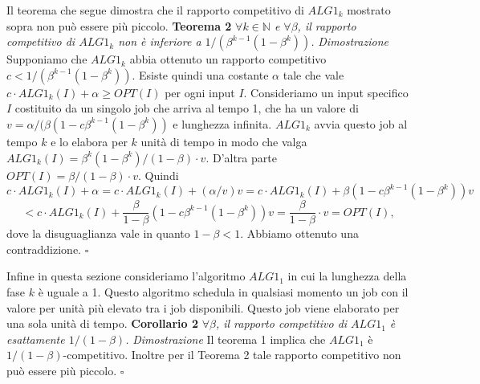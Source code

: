 \documentclass[12pt]{article}
\newcommand*{\N}{\mathbb{N}}
\begin{document}
Il teorema che segue dimostra che il rapporto competitivo di $ALG1_{k}$ mostrato sopra non può essere più piccolo.\newline\newline
\textbf{Teorema 2}
\textit{$\forall k \in \N$ e $\forall \beta$, il rapporto competitivo di $ALG1_{k}$ non è inferiore a $1 / (\beta^{k - 1} (1 - \beta^{k}))$.}\newline\newline
\textit{Dimostrazione}
Supponiamo che $ALG1_{k}$ abbia ottenuto un rapporto competitivo $c < 1 / (\beta^{k - 1} (1 - \beta^{k}))$. Esiste quindi una costante $\alpha$ tale che vale $c \cdot ALG1_{k}(I) + \alpha \geq OPT (I)$ per ogni input $I$. Consideriamo un input specifico $I$ costituito da un singolo job che arriva al tempo 1,  che ha un valore di $v = \alpha / (\beta  (1 - c \beta^{k - 1} (1 - \beta^{k}))$ e lunghezza infinita. $ALG1_{k}$ avvia questo job al tempo $k$ e lo elabora per $k$ unità di tempo in modo che valga $ALG1_{k}(I) = \beta^{k} (1 - \beta^{k}) / (1 - \beta ) \cdot v$. D'altra parte $OPT (I) = \beta  / (1 - \beta ) \cdot v$. Quindi $$c \cdot ALG1_{k}(I) + \alpha = c \cdot ALG1_{k}(I) + (\alpha / v) v = c \cdot ALG1_{k}(I) + \beta  (1 - c\beta^{k - 1} (1 - \beta^{k})) v $$ $$< c \cdot ALG1_{k}(I) + \frac{\beta}{ 1 - \beta} (1 - c\beta^{k - 1} (1 - \beta^{k})) v = \frac{\beta}{1 - \beta} \cdot v = OPT(I),$$dove la disuguaglianza vale in quanto $1 - \beta  <1$. Abbiamo ottenuto una contraddizione. \hfill $\square$ \vspace{5mm}

Infine in questa sezione consideriamo l'algoritmo $ALG1_{1}$ in cui la lunghezza della fase $k$ è uguale a 1. Questo algoritmo schedula in qualsiasi momento un job con il valore per unità più elevato tra i job disponibili. Questo job viene elaborato per una sola unità di tempo. \newline\newline
\textbf{Corollario 2}
\textit{$\forall \beta$, il rapporto competitivo di $ALG1_{1}$ è esattamente $1 / (1 - \beta)$.}\newline\newline
\textit{Dimostrazione}
Il teorema 1 implica che $ALG1_{1}$ è $1 / (1 - \beta )$-competitivo. Inoltre per il Teorema 2 tale rapporto competitivo non può essere più piccolo. \hfill $\square$ \vspace{5mm}
\end{document}

